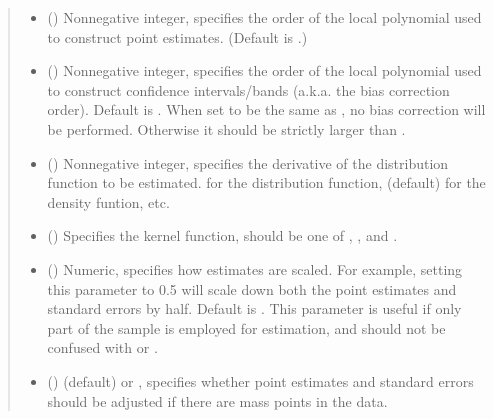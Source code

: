 \documentclass[letterpaper,10pt,english]{sphinxmanual}
\begin{document}
\begin{fulllineitems}
\begin{quote}
\begin{description}
\begin{itemize}
\item {} 
\sphinxAtStartPar
{} () \textendash{} Nonnegative integer, specifies the order of the local polynomial used to construct point estimates. (Default is .)

\item {} 
\sphinxAtStartPar
{} () \textendash{} Nonnegative integer, specifies the order of the local polynomial used to construct confidence intervals/bands (a.k.a. the bias correction order). Default is . When set to be the same as , no bias correction will be performed. Otherwise it should be strictly larger than .

\item {} 
\sphinxAtStartPar
{} () \textendash{} Nonnegative integer, specifies the derivative of the distribution function to be estimated.  for the distribution function,  (default) for the density funtion, etc.

\item {} 
\sphinxAtStartPar
{} () \textendash{} Specifies the kernel function, should be one of , , and .

\item {} 
\sphinxAtStartPar
{} () \textendash{} Numeric, specifies how estimates are scaled. For example, setting this parameter to 0.5 will scale down both the point estimates and standard errors by half. Default is . This parameter is useful if only part of the sample is employed for estimation, and should not be confused with  or .

\item {} 
\sphinxAtStartPar
{} () \textendash{}  (default) or , specifies whether point estimates and standard errors should be adjusted if there are mass points in the data.


\end{itemize}
\end{description}
\end{quote}
\end{fulllineitems}
\end{document}
